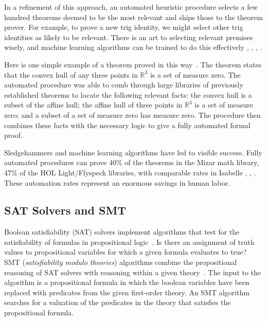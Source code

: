 \documentclass[brochure,english,12pt]{bourbaki}
\theoremstyle{plain}
\def\ring#1{{\mathbb{#1}}}
\begin{document}
In a refinement of this approach, an automated heuristic procedure
selects a few hundred theorems deemed to be the most relevant and
ships those to the theorem prover.  For example, to prove a new trig
identity, we might select other trig identities as likely to be
relevant.  There is an art to selecting relevant premises wisely, and
machine learning algorithms can be trained to do this effectively
\cite{urban2010evaluation},  
\cite{kaliszyk2012learning}, \cite{kaliszyk2013automated},
\cite{alama2014premise}.


Here is one simple example of a theorem proved in this
way~\cite{kaliszyk2014learning}.  The theorem states that the convex
hull of any three points in $\ring{R}^3$ is a set of measure zero.
The automated procedure was able to comb through large libraries of
previously established theorems to locate the following relevant
facts: the convex hull is a subset of the affine hull; the affine hull
of three points in $\ring{R}^3$ is a set of measure zero; and a subset
of a set of measure zero has measure zero.  The procedure then
combines these facts with the necessary logic to give a fully
automated formal proof.

Sledgehammers and machine learning algorithms have led to visible
success.  Fully automated procedures can prove 40\% of the theorems in
the Mizar math library, 47\% of the HOL Light/Flyspeck libraries, with
comparable rates in Isabelle \cite{DBLP:journals/corr/KaliszykU13b},
\cite{kaliszyk2014learning}, \cite{bohme2010sledgehammer}.  These
automation rates represent an enormous savings in human labor.  


\subsection{SAT Solvers and SMT}

Boolean satisfiability (SAT) solvers implement algorithms that test
for the satisfiability of formulas in propositional
logic~\cite{marques2009conflict}.  Is there an assignment of truth
values to propositional variables for which a given formula evaluates
to true?  SMT ({\it satisfiability modulo theories}) algorithms combine
the propositional reasoning of SAT solvers with reasoning within a
given theory~\cite{barrett2009satisfiability}.  The input to the
algorithm is a propositional formula in which the boolean variables
have been replaced with predicates from the given first-order theory.  An SMT
algorithm searches for a valuation of the predicates in the theory
that satisfies the propositional formula.
\end{document}
